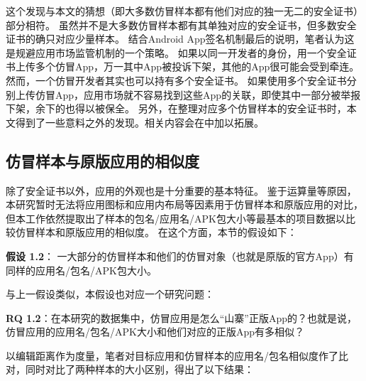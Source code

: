 这个发现与本文的猜想（即大多数仿冒样本都有他们对应的独一无二的安全证书）部分相符。
虽然并不是大多数仿冒样本都有其单独对应的安全证书，但多数安全证书的确只对应少量样本。
结合Android App签名机制最后的说明，笔者认为这是规避应用市场监管机制的一个策略。
如果以同一开发者的身份，用一个安全证书上传多个仿冒App，万一其中App被投诉下架，其他的App很可能会受到牵连。
然而，一个仿冒开发者其实也可以持有多个安全证书。
如果使用多个安全证书分别上传仿冒App，应用市场就不容易找到这些App的关联，即使其中一部分被举报下架，余下的也得以被保全。
另外，在整理对应多个仿冒样本的安全证书时，本文得到了一些意料之外的发现。相关内容会在中加以拓展。

\subsection{仿冒样本与原版应用的相似度}

除了安全证书以外，应用的外观也是十分重要的基本特征。
鉴于运算量等原因，本研究暂时无法将应用图标和应用内布局等因素用于仿冒样本和原版应用的对比，但本工作依然提取出了样本的包名/应用名/APK包大小等最基本的项目数据以比较仿冒样本和原版应用的相似度。
在这个方面，本节的假设如下：

{\bf 假设 1.2}： 一大部分的仿冒样本和他们的仿冒对象（也就是原版的官方App）有同样的应用名/包名/APK包大小。

与上一假设类似，本假设也对应一个研究问题：

{\bf RQ 1.2}：在本研究的数据集中，仿冒应用是怎么``山寨''正版App的？也就是说，仿冒应用的应用名/包名/APK大小和他们对应的正版App有多相似？

以编辑距离作为度量，笔者对目标应用和仿冒样本的应用名/包名相似度作了比对，同时对比了两种样本的大小区别，得出了以下结果：


